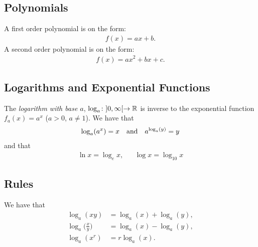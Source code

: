 \subsection{Polynomials}
A first order polynomial is on the form:
\begin{align*}
f(x)=ax+b.
\end{align*}
A second order polynomial is on the form:
\begin{align*}
f(x)=ax^2+bx+c.
\end{align*}
\subsection{Logarithms and Exponential Functions}
The \emph{logarithm with base $a$}, $\log_a\colon ]0,\infty[\to \mathbb{R}$ is inverse to the exponential function $f_a(x)=a^x$ ($a>0$, $a\neq 1$). We have that
\begin{align*}
\log_a(a^x)=x\quad \textup{and} \quad a^{\log_a(y)}=y
\end{align*}
and that
\begin{align*}
\ln x=\log_e x,&& \log x=\log_{10} x
\end{align*}
\subsection{Rules}
We have that
\begin{align*}
\log_a(xy)&=\log_a(x)+\log_a(y),\\\log_a\Big(\frac{x}{y}\Big)&=\log_a(x)-\log_a(y),\\ \log_a(x^r)&=r\log_a(x).
\end{align*}
